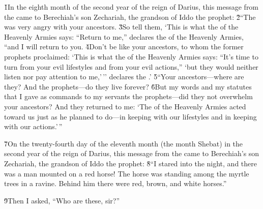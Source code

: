 


\v{1}In the eighth month of the second year of the reign of Darius, this message from the  came to Berechiah's son Zechariah, the grandson of Iddo the prophet: \v{2}``The  was very angry with your ancestors. \v{3}So tell them, `This is what the  of the Heavenly Armies says: ``Return to me,'' declares the  of the Heavenly Armies, ``and I will return to you. \v{4}Don't be like your ancestors, to whom the former prophets proclaimed: `This is what the  of the Heavenly Armies says: ``It's time to turn from your evil lifestyles and from your evil actions,'' `but they would neither listen nor pay attention to me,'\,'' declares the .' \v{5}``Your ancestors---where are they? And the prophets---do they live forever? \v{6}But my words and my statutes that I gave as commands to my servants the prophets---did they not overwhelm your ancestors? And they returned to me: `The  of the Heavenly Armies acted toward us just as he planned to do---in keeping with our lifestyles and in keeping with our actions.'\,''

\v{7}On the twenty-fourth day of the eleventh month (the month Shebat) in the second year of the reign of Darius, this message from the  came to Berechiah's son Zechariah, the grandson of Iddo the prophet: \v{8}``I stared into the night, and there was a man mounted on a red horse! The horse was standing among the myrtle trees in a ravine. Behind him there were red, brown, and white horses.''

\v{9}Then I asked, ``Who are these, sir?''

